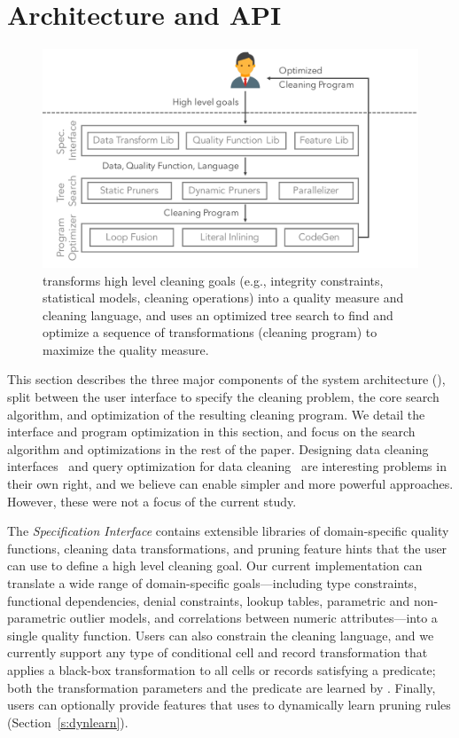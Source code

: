 \section{Architecture and API}
\begin{figure}[t]
\centering
 \includegraphics[width=.8\columnwidth]{ac-experiments/alphacleanarch.pdf}
 \caption{\small \sys transforms high level cleaning goals (e.g., integrity constraints, statistical models, cleaning operations) into a quality measure and cleaning language, and uses an optimized tree search to find and optimize a sequence of transformations (cleaning program) to maximize the quality measure.   \label{fig:arch} }
\end{figure}
This section describes the three major components of the \sys system architecture (), split between the user interface to specify the cleaning problem, the core search algorithm, and optimization of the resulting cleaning program.  We detail the interface and program optimization in this section, and focus on the search algorithm and optimizations in the rest of the paper. Designing data cleaning interfaces~\cite{DBLP:conf/uist/GuoKHH11} and query optimization for data cleaning~\cite{DBLP:conf/vldb/GalhardasFSSS01, khayyat2015bigdansing} are interesting problems in their own right, and we believe \sys can enable simpler and more powerful approaches.  However, these were not a focus of the current study.

The {\it Specification Interface} contains extensible libraries of domain-specific quality functions, cleaning data transformations, and pruning feature hints that the user can use to define a high level cleaning goal.  Our current implementation can translate a wide range of domain-specific goals---including type constraints, functional dependencies, denial constraints, lookup tables, parametric and non-parametric outlier models, and correlations between numeric attributes---into a single quality function.  Users can also constrain the cleaning language, and we currently support any type of conditional cell and record transformation that applies a black-box transformation to all cells or records satisfying a predicate; both the transformation parameters and the predicate are learned by \sys.  Finally, users can optionally provide features that \sys uses to dynamically learn pruning rules (Section~\ref{s:dynlearn}).

